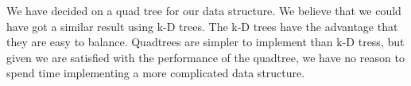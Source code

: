 We have decided on a quad tree for our data structure. We believe that we could have got a similar result using k-D trees. The k-D trees have the advantage that they are easy to balance. Quadtrees are simpler to implement than k-D tress, but given we are satisfied with the performance of the quadtree, we have no reason to spend time implementing a more complicated data structure.